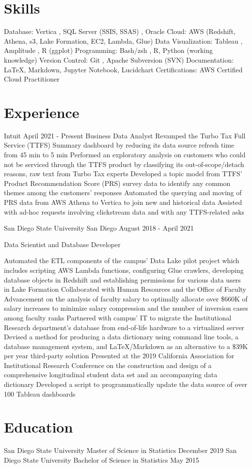 \documentclass[12pt]{article}
\begin{document}
\section*{Skills}




Database: 
Vertica
, SQL Server (SSIS, SSAS)
, Oracle
Cloud: AWS (Redshift, Athena, s3, Lake Formation, EC2, Lambda, Glue)
Data Visualization: Tableau
, Amplitude
, R (ggplot)
Programming: Bash/zsh
, R,
Python (working knowledge)
Version Control:
Git
, Apache Subversion (SVN)
Documentation: LaTeX, Markdown, Jupyter Notebook, Lucidchart
Certifications: AWS Certified Cloud Practitioner

\begin{itemize}



\end{itemize}
\section*{Experience}

Intuit April 2021 - Present
Business Data Analyst
Revamped the Turbo Tax Full Service (TTFS) Summary dashboard by reducing its data source refresh time from 45 min to 5 min
Performed an exploratory analysis on customers who could not be serviced through the TTFS product by classifying its out-of-scope/detach reasons, raw text from Turbo Tax experts
Developed a topic model from TTFS’ Product Recommendation Score (PRS) survey data to identify any common themes among the customers’ responses
Automated the querying and moving of PRS data from AWS Athena to Vertica to join new and historical data
Assisted with ad-hoc requests involving clickstream data and with any TTFS-related asks

San Diego State University San Diego August 2018 - April 2021

Data Scientist and Database Developer

Automated the ETL components of the campus’ Data Lake pilot project which includes scripting AWS Lambda functions, configuring Glue crawlers, developing database objects in Redshift and establishing permissions for various data users in Lake Formation
Collaborated with Human Resources and the Office of Faculty Advancement on the analysis of faculty salary to optimally allocate over \$660K of salary increases to minimize salary compression and the number of inversion cases among faculty ranks
Partnered with campus’ IT to migrate the Institutional Research department’s database from end-of-life hardware to a virtualized server
Devised a method for producing a data dictionary using command line tools, a database management system, and LaTeX/Markdown as an alternative to a \$39K per year third-party solution
Presented at the 2019 California Association for Institutional Research Conference on the construction and design of a comprehensive longitudinal student data set and an accompanying data dictionary
Developed a script to programmatically update the data source of over 100 Tableau dashboards


\section*{Education}

San Diego State University Master of Science in Statistics December 2019
San Diego State University Bachelor of Science in Statistics May 2015
\end{document}
